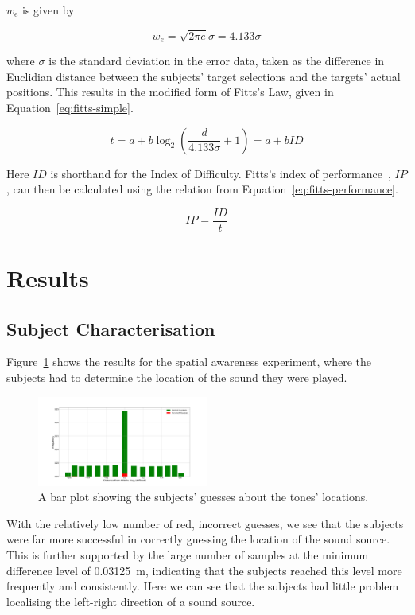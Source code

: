 \documentclass[format=sigconf, review=true, screen=true, anonymous=true]{acmart}
\begin{document}
$w_e$ is given by 

\[
  w_e = \sqrt{2\pi e}\sigma = 4.133\sigma
\]

where $\sigma$ is the standard deviation in the error data, taken as the difference in Euclidian distance between the subjects' target selections and the targets' actual positions. This results in the modified form of Fitts's Law, given in Equation~\ref{eq:fitts-simple}.

\begin{equation}
  \label{eq:fitts-simple}
  t = a + b\log_2\left(\frac{d}{4.133\sigma} + 1\right) = a + b ID
\end{equation}

Here $ID$ is shorthand for the Index of Difficulty. Fitts's index of performance~\cite[p.~390]{fitts1954information}, $IP$, can then be calculated using the relation from Equation~\ref{eq:fitts-performance}. 

\begin{equation}
  \label{eq:fitts-performance}
  IP = \frac{ID}{t}
\end{equation}

\section{Results}
\label{sec:results}

\subsection{Subject Characterisation}

Figure~\ref{fig:location-guesses} shows the results for the spatial awareness experiment, where the subjects had to determine the location of the sound they were played. 

\begin{figure}
  \centering
  \includegraphics[width=0.5\textwidth]{figures/location_guesses.png}
  \caption{A bar plot showing the subjects' guesses about the tones' locations.}
  \label{fig:location-guesses}
\end{figure}

With the relatively low number of red, incorrect guesses, we see that the subjects were far more successful in correctly guessing the location of the sound source. This is further supported by the large number of samples at the minimum difference level of \SI{0.03125}{\m}, indicating that the subjects reached this level more frequently and consistently. Here we can see that the subjects had little problem localising the left-right direction of a sound source. 
\end{document}
